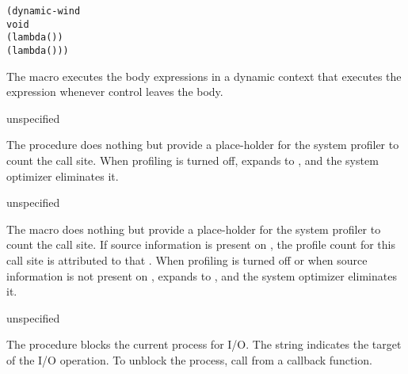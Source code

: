 \begin{syntax}
\end{syntax}
\expandsto{}\begin{alltt}\antipar
(dynamic-wind
  void
  (lambda ()   \etc{})
  (lambda () ))\end{alltt}

The  macro executes the body expressions 
 \etc{} in a dynamic context that executes the 
expression whenever control leaves the body.

\begin{procedure}
\end{procedure}
\returns{} unspecified

The  procedure does nothing but provide a
place-holder for the system profiler to count the call site. When
profiling is turned off,  expands to
, and the system optimizer eliminates it.

\begin{syntax}
\end{syntax}
\returns{} unspecified

The  macro does nothing but provide a
place-holder for the system profiler to count the call site.
If source information is present on , the profile count
for this call site is attributed to that .
When profiling is turned off or when source information is not
present on ,  expands to
, and the system optimizer eliminates it.

\begin{procedure}
\end{procedure}
\returns{} unspecified

The  procedure blocks the current process for
I/O. The  string indicates the target of the I/O
operation. To unblock the process, call  from a
callback function.

